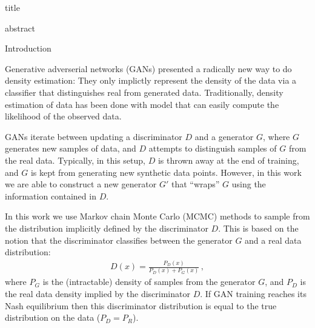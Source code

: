 
title

abstract

Introduction

Generative adverserial networks (GANs) presented a radically new way to do density estimation:
They only implictly represent the density of the data via a classifier that distinguishes real from generated data.
Traditionally, density estimation of data has been done with model that can easily compute the likelihood of the observed data.

GANs iterate between updating a discriminator $D$ and a generator $G$, where $G$ generates new samples of data, and $D$ attempts to distinguish samples of $G$ from the real data.
Typically, in this setup, $D$ is thrown away at the end of training, and $G$ is kept from generating new synthetic data points.
However, in this work we are able to construct a new generator $G'$ that ``wraps'' $G$ using the information contained in $D$.


In this work we use Markov chain Monte Carlo (MCMC) methods to sample from the distribution implicitly defined by the discriminator $D$.
This is based on the notion that the discriminator classifies between the generator $G$ and a real data distribution:
\begin{align}
  D(x) = \frac{P_D(x)}{P_D(x) + P_G(x)}\,,
\end{align}
where $P_G$ is the (intractable) density of samples from the generator $G$, and $P_D$ is the real data density implied by the discriminator $D$.
If GAN training reaches its Nash equilibrium then this discriminator distribution is equal to the true distribution on the data ($P_D = P_R$)\@.  %

